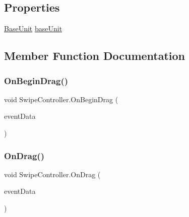\subsection*{Properties}
\begin{DoxyCompactItemize}
\item 
\mbox{\hyperlink{class_base_unit}{Base\+Unit}} \mbox{\hyperlink{class_swipe_controller_a422f7e579179be4a1e6e198d97068cc2}{base\+Unit}}
\end{DoxyCompactItemize}


\subsection{Member Function Documentation}
\mbox{\label{class_swipe_controller_a6f7b3f648901c5cc45a9da620ec7ccfa}} 
\subsubsection{\texorpdfstring{OnBeginDrag()}{OnBeginDrag()}}
{\footnotesize\ttfamily void Swipe\+Controller.\+On\+Begin\+Drag (\begin{DoxyParamCaption}\item[{Pointer\+Event\+Data}]{event\+Data }\end{DoxyParamCaption})}

\mbox{\label{class_swipe_controller_a5d6462d855ab4cd7496dde16c7eba5f3}} 
\subsubsection{\texorpdfstring{OnDrag()}{OnDrag()}}
{\footnotesize\ttfamily void Swipe\+Controller.\+On\+Drag (\begin{DoxyParamCaption}\item[{Pointer\+Event\+Data}]{event\+Data }\end{DoxyParamCaption})}

\mbox{\label{class_swipe_controller_a59530aa6a8d5a2de12d7f39851ce3d2b}} 
